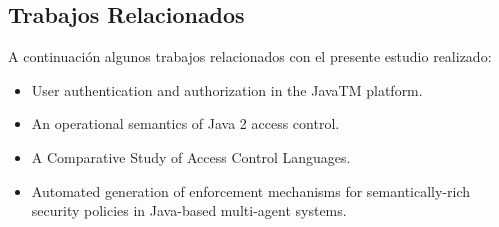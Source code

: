 \subsection{Trabajos Relacionados}

A continuación algunos trabajos relacionados con el presente estudio
realizado:

\begin{itemize}
	\item User authentication and authorization in the JavaTM platform.~\cite{paper4}
	\item An operational semantics of Java 2 access control.~\cite{paper1}
	\item A Comparative Study of Access Control Languages.~\cite{paper2}
	\item Automated generation of enforcement mechanisms for semantically-rich security policies in Java-based multi-agent systems.~\cite{paper3}
\end{itemize}
